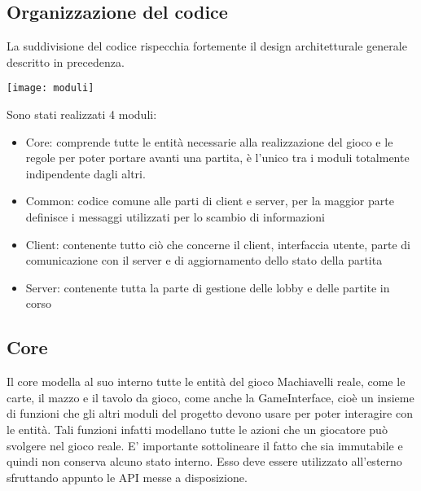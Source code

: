 \subsection{Organizzazione del codice}
La suddivisione del codice rispecchia fortemente il design architetturale generale descritto in precedenza.
\begin{center}
    \texttt{[image: moduli]}
\end{center}
Sono stati realizzati 4 moduli:
\begin{itemize}
    \item Core: comprende tutte le entità necessarie alla realizzazione del gioco e le regole per poter portare avanti una partita, è l’unico tra i moduli totalmente indipendente dagli altri.
    \item Common: codice comune alle parti di client e server, per la maggior parte definisce i messaggi utilizzati per lo scambio di informazioni
    \item Client: contenente tutto ciò che concerne il client, interfaccia utente, parte di comunicazione con il server e di aggiornamento dello stato della partita
    \item Server: contenente tutta la parte di gestione delle lobby e delle partite in corso
\end{itemize}

\subsection{Core}
Il core modella al suo interno tutte le entità del gioco Machiavelli reale, come le carte, il mazzo e il tavolo da gioco, come anche la GameInterface, cioè un insieme di funzioni che gli altri moduli del progetto devono usare per poter interagire con le entità.
Tali funzioni infatti modellano tutte le azioni che un giocatore può svolgere nel gioco reale.
\newline
E’ importante sottolineare il fatto che sia immutabile e quindi non conserva alcuno stato interno.
Esso deve essere utilizzato all’esterno sfruttando appunto le API messe a disposizione.

